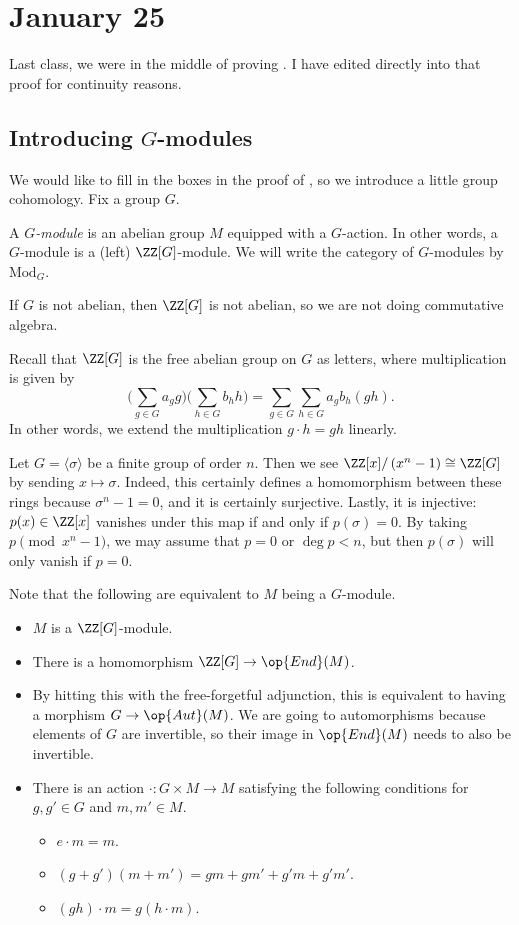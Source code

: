 \documentclass[../notes.tex]{subfiles}
\begin{document}
\section{January 25}

Last class, we were in the middle of proving . I have edited directly into that proof for continuity reasons.

\subsection{Introducing \texorpdfstring{$G$}{ G}-modules}
We would like to fill in the boxes in the proof of , so we introduce a little group cohomology. Fix a group $G$.
\begin{defihelper}[$G$-module] 
	A \textit{$G$-module} is an abelian group $M$ equipped with a $G$-action. In other words, a $G$-module is a (left) $\ZZ[G]$-module. We will write the category of $G$-modules by $\mathrm{Mod}_G$.
\end{defihelper}
\begin{warn}
	If $G$ is not abelian, then $\ZZ[G]$ is not abelian, so we are not doing commutative algebra.
\end{warn}
Recall that $\ZZ[G]$ is the free abelian group on $G$ as letters, where multiplication is given by
\[\Bigg(\sum_{g\in G}a_gg\Bigg)\Bigg(\sum_{h\in G}b_hh\Bigg)=\sum_{g\in G}\sum_{h\in G}a_gb_h(gh).\]
In other words, we extend the multiplication $g\cdot h=gh$ linearly.
\begin{example} \label{ex:cyclic-group-module}
	Let $G=\langle\sigma\rangle$ be a finite group of order $n$. Then we see $\ZZ[x]/\left(x^n-1\right)\cong\ZZ[G]$ by sending $x\mapsto\sigma$. Indeed, this certainly defines a homomorphism between these rings because $\sigma^n-1=0$, and it is certainly surjective. Lastly, it is injective: $p(x)\in\ZZ[x]$ vanishes under this map if and only if $p(\sigma)=0$. By taking $p\pmod{x^n-1}$, we may assume that $p=0$ or $\deg p<n$, but then $p(\sigma)$ will only vanish if $p=0$.
\end{example}
Note that the following are equivalent to $M$ being a $G$-module.
\begin{itemize}
	\item $M$ is a $\ZZ[G]$-module.
	\item There is a homomorphism $\ZZ[G]\to\op{End}(M)$.
	\item By hitting this with the free-forgetful adjunction, this is equivalent to having a morphism $G\to\op{Aut}(M)$. We are going to automorphisms because elements of $G$ are invertible, so their image in $\op{End}(M)$ needs to also be invertible.
	\item There is an action $\cdot\colon G\times M\to M$ satisfying the following conditions for $g,g'\in G$ and $m,m'\in M$.
	\begin{itemize}
		\item $e\cdot m=m$.
		\item $(g+g')(m+m')=gm+gm'+g'm+g'm'$.
		\item $(gh)\cdot m=g(h\cdot m)$.
	\end{itemize}
\end{itemize}
\end{document}
